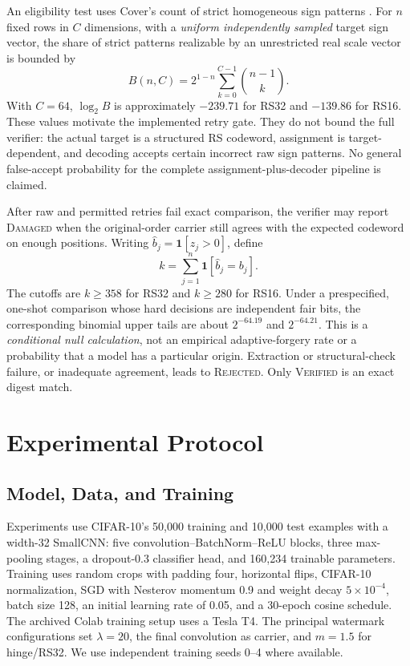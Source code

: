 \documentclass[conference]{IEEEtran}
\begin{document}
An eligibility test uses Cover's count of strict homogeneous sign patterns
\cite{cover1965geometrical}. For $n$ fixed rows in $C$ dimensions, with a
\emph{uniform independently sampled} target sign vector, the share of
strict patterns realizable by an unrestricted real scale vector is bounded by
\begin{equation}
 B(n,C)=2^{1-n}\sum_{k=0}^{C-1}\binom{n-1}{k}.
 \label{eq:cover}
\end{equation}
With $C=64$, $\log_2 B$ is approximately $-239.71$ for RS32 and $-139.86$
for RS16. These values motivate the implemented retry gate. They do not
bound the full verifier: the actual target is a structured RS codeword,
assignment is target-dependent, and decoding accepts certain incorrect raw
sign patterns. No general false-accept probability for the complete
assignment-plus-decoder pipeline is claimed.

After raw and permitted retries fail exact comparison, the verifier may
report \textsc{Damaged} when the original-order carrier still agrees with
the expected codeword on enough positions. Writing
$\widehat b_j=\mathbf{1}[z_j>0]$, define
\begin{equation}
 k=\sum_{j=1}^n \mathbf{1}[\widehat b_j=b_j].
 \label{eq:agree}
\end{equation}
The cutoffs are $k\ge358$ for RS32 and $k\ge280$ for RS16. Under a
prespecified, one-shot comparison whose hard decisions are independent fair
bits, the corresponding binomial upper tails are about $2^{-64.19}$ and
$2^{-64.21}$. This is a \emph{conditional null calculation}, not an empirical
adaptive-forgery rate or a probability that a model has a particular origin.
Extraction or structural-check failure, or inadequate agreement, leads to
\textsc{Rejected}. Only \textsc{Verified} is an exact digest match.

\section{Experimental Protocol}
\label{sec:setup}
\subsection{Model, Data, and Training}
Experiments use CIFAR-10's 50,000 training and 10,000 test examples
\cite{cifar10} with a width-32 SmallCNN: five convolution--BatchNorm--ReLU
blocks, three max-pooling stages, a dropout-0.3 classifier head, and 160,234
trainable parameters. Training uses random crops with padding four,
horizontal flips, CIFAR-10 normalization, SGD with Nesterov momentum 0.9 and
weight decay $5\times10^{-4}$, batch size 128, an initial learning rate of
0.05, and a 30-epoch cosine schedule. The archived Colab training setup uses
a Tesla T4. The principal watermark configurations set $\lambda=20$, the
final convolution as carrier, and $m=1.5$ for hinge/RS32. We use independent
training seeds 0--4 where available.
\end{document}
